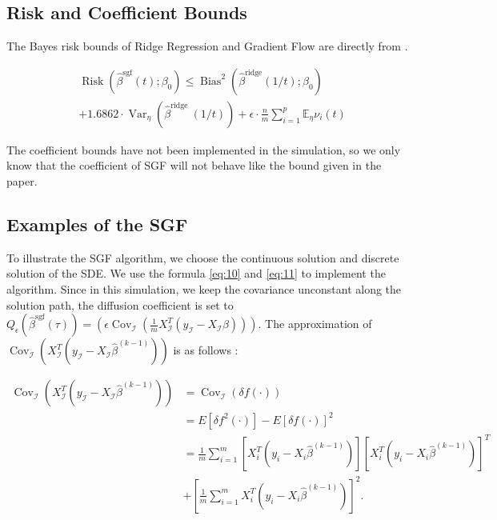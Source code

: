 \documentclass[11pt]{article}
\begin{document}
\subsection{Risk and Coefficient Bounds} \label{Bounds}

The Bayes risk bounds of Ridge Regression and Gradient Flow are directly from \cite{ali2019continuous}. 

\begin{equation}
\label{eq:bound}
    \begin{aligned}
    &\operatorname{Risk}\left(\hat{\beta}^{\operatorname{sgf}}(t) ; \beta_{0}\right) \leq \operatorname{Bias}^{2}\left(\hat{\beta}^{\operatorname{ridge}}(1 / t) ; \beta_{0}\right) \\
    &+1.6862 \cdot \operatorname{Var}_{\eta}\left(\hat{\beta}^{\text {ridge }}(1 / t)\right)+\epsilon \cdot \frac{n}{m} \sum_{i=1}^{p} \mathbb{E}_{\eta} \nu_{i}(t)
    \end{aligned}
\end{equation}

The coefficient bounds have not been implemented in the simulation, so we only know that the coefficient of SGF will not behave like the bound given in the paper.

\subsection{Examples of the SGF} \label{Example}

To illustrate the SGF algorithm, we choose the continuous solution and discrete solution of the SDE. We use the formula \ref{eq:10} and \ref{eq:11} to implement the algorithm. Since in this simulation, we keep the covariance unconstant along the solution path, the diffusion coefficient is set to $Q_{\epsilon}\left(\hat{\beta}^{\operatorname{sgf}}(\tau)\right)= \left(\epsilon \operatorname{Cov}_{\mathcal{I}}\left(\frac{1}{m} X_{\mathcal{I}}^{T}\left(y_{\mathcal{I}}-X_{\mathcal{I}} \beta\right)\right)\right)$. The approximation of $\operatorname{Cov}_{\mathcal{I}} \left( X_{\mathcal{I}}^{T}\left(y_{\mathcal{I}}-X_{\mathcal{I}} \hat{\beta}^{(k-1)}\right)\right)$ is as follows :
        
\begin{equation}
\label{eq:cov}
    \begin{aligned}
    \operatorname{Cov}_{\mathcal{I}} \left( X_{\mathcal{I}}^{T}\left(y_{\mathcal{I}}-X_{\mathcal{I}} \hat{\beta}^{(k-1)}\right)\right) &= \operatorname{Cov}_{\mathcal{I}} \left( \delta f(\cdot) \right) \\
    &= E\left[ \delta f^2(\cdot) \right] - E\left[ \delta f(\cdot) \right]^2 \\
    &= \frac{1}{m} \sum_{i=1}^m \left[ X_i^{T}\left(y_i-X_i \hat{\beta}^{(k-1)}\right)\right] \left[ X_i^{T}\left(y_i-X_i \hat{\beta}^{(k-1)}\right)\right]^T \\
    &+ \left[ \frac{1}{m} \sum_{i=1}^m X_i^{T}\left(y_i-X_i \hat{\beta}^{(k-1)}\right)\right]^2 .
    \end{aligned}
\end{equation}
\end{document}
